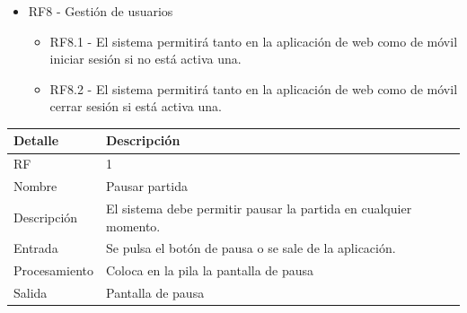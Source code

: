 \documentclass{article}
\begin{document}
\begin{itemize}
\begin{itemize}
      
    \end{itemize}

    \item RF8 - Gestión de usuarios
    \begin{itemize}
      \item RF8.1 - El sistema permitirá tanto en la aplicación de web como de móvil iniciar sesión si no está activa una.
      \item RF8.2 - El sistema permitirá tanto en la aplicación de web como de móvil cerrar sesión si está activa una.
    \end{itemize}

    

\end{itemize}

\begin{table}[H]
  \begin{center}
    \begin{tabularx}{\linewidth}{|X|X|X|} %
      \hline
      \textbf{Detalle} & \textbf{Descripción}\\
      \hline
      RF & 1 \\
      \hline
      Nombre & Pausar partida\\
      \hline
      Descripción & El sistema debe permitir pausar la partida en cualquier momento.\\
      \hline
      Entrada & Se pulsa el botón de pausa o se sale de la aplicación.\\
      \hline
      Procesamiento & Coloca en la pila la pantalla de pausa\\
      \hline
      Salida & Pantalla de pausa\\
      \hline
    \end{tabularx}
  \end{center}
\end{table}
\end{document}
